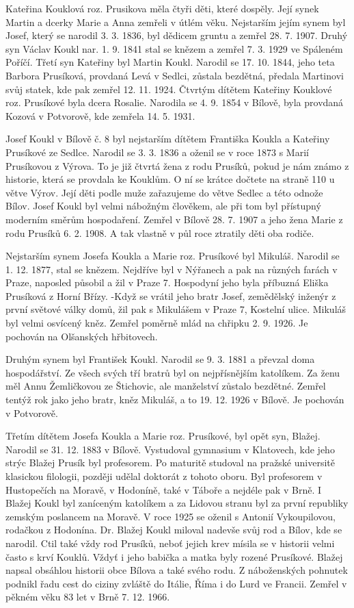 \documentclass[../dejiny-rodu-prusiku.tex]{subfiles}
\begin{document}
Kateřina Kouklová roz. Prusikova měla čtyři děti, které dospěly. Její synek Martin a dcerky Marie a Anna zemřeli v útlém věku. Nejstarším jejím synem byl Josef, který se narodil 3. 3. 1836, byl dědicem gruntu a zemřel 28. 7. 1907. Druhý syn Václav Koukl nar. 1. 9. 1841 stal se knězem a zemřel 7. 3. 1929 ve Spáleném Poříčí. Třetí syn Kateřiny byl Martin Koukl. Narodil se 17. 10. 1844, jeho teta
Barbora Prusíková, provdaná Levá v Sedlci, zůsta­la bezdětná, předala Martinovi svůj statek, kde pak zemřel 12. 11. 1924. Čtvrtým dítětem Kateřiny Kouklové roz. Prusíkové byla dcera Rosalie. Narodila se 4. 9. 1854 v Bílově, byla provdaná Kozová v Potvorově, kde zemřela 14. 5. 1931.

Josef Koukl v Bílově č. 8 byl nejstarším dítětem Františka Koukla a Kateřiny Prusíkové ze Sedlce. Narodil se 3. 3. 1836 a oženil se v roce 1873 s Marií Prusíkovou z Výrova. To je již čtvrtá žena z rodu Prusíků, pokud je nám známo z historie, která se provdala ke Kouklům. O ní se krátce dočtete na straně 110 u větve Výrov. Její děti podle muže zařazujeme do větve Sedlec a této odnože Bílov. Josef Koukl byl velmi nábožným člověkem, ale při tom byl přístupný moderním směrům hospodaření. Zemřel v Bílově 28. 7. 1907 a jeho žena Marie z rodu Prusíků 6. 2. 1908. A tak vlastně v půl roce ztratily děti oba rodiče.

Nejstarším synem Josefa Koukla a Marie roz. Prusíkové byl Mikuláš. Narodil se 1. 12. 1877, stal se knězem. Nejdříve byl v Nýřanech a pak na různých farách v Praze, naposled působil a žil v Praze 7. Hospodyní jeho byla příbuzná Eliška Prusíková z Horní Břízy. -Když se vrátil jeho bratr Josef, zemědělský inženýr z první světové války domů, žil pak s Mikulášem v Praze 7, Kostel­ní ulice. Mikuláš byl velmi osvícený kněz. Zemřel po­měrně mlád na chřipku 2. 9. 1926. Je pochován na Olšan­ských hřbitovech.

Druhým synem byl František Koukl. Narodil se 9. 3. 1881 a převzal doma hospodářství. Ze všech svých tří bratrů byl on nejpřísnějším katolíkem. Za ženu měl Annu Žemličkovou ze Štichovic, ale manželství zůstalo bez­dětné. Zemřel tentýž rok jako jeho bratr, kněz Mikuláš, a to 19. 12. 1926 v Bílově. Je pochován v Potvorově.

Třetím dítětem Josefa Koukla a Marie roz. Prusíkové, byl opět syn, Blažej. Narodil se 31. 12. 1883 v Bílově. Vystudoval gymnasium v Klatovech, kde jeho strýc Bla­žej Prusík byl profesorem. Po maturitě studoval na praž­ské universitě klasickou filologii, později udělal doktorát z tohoto oboru. Byl profesorem v Hustopečích na Mo­ravě, v Hodoníně, také v Táboře a nejdéle pak v Brně. I Blažej Koukl byl zaníceným katolíkem a za Lidovou stranu byl za první republiky zemským poslancem na Moravě. V roce 1925 se oženil s Antonií Vykoupilovou, rodačkou z Hodonína. Dr. Blažej Koukl miloval nadevše svůj rod a Bílov, kde se narodil. Ctil také vždy rod Prusíků, neboť jejich krev mísila se v historii velmi často s krví Kouklů. Vždyť i jeho babička a matka byly rozené Prusíkové. Blažej napsal obsáhlou historii obce Bílova a také svého rodu. Z náboženských pohnutek podnikl řa­du cest do ciziny zvláště do Itálie, Říma i do Lurd ve Francii. Zemřel v pěkném věku 83 let v Brně 7. 12. 1966.
\end{document}
